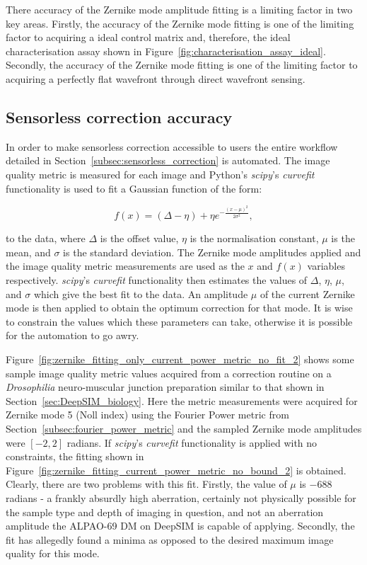 There accuracy of the Zernike mode amplitude fitting is a limiting factor in two key areas. Firstly, the accuracy of the Zernike mode fitting is one of the limiting factor to acquiring a ideal control matrix and, therefore, the ideal characterisation assay shown in Figure~\ref{fig:characterisation_assay_ideal}. Secondly, the accuracy of the Zernike mode fitting is one of the limiting factor to acquiring a perfectly flat wavefront through direct wavefront sensing.

\subsection{Sensorless correction accuracy}
\label{subsec:sensorless_accuracy}

In order to make sensorless correction accessible to users the entire 
workflow detailed in Section~\ref{subsec:sensorless_correction} is 
automated. The image quality metric is measured for each image and Python's 
\textit{scipy}'s \textit{curve\textunderscore fit} 
functionality\cite{virtanen2020scipy} is used to fit a Gaussian function of 
the form:

\begin{equation}\label{eq:gaussian}
	f(x) = (\Delta - \eta) + \eta e^{-\frac{\left(x-\mu\right)^{2}}{2\sigma^{2}}},
\end{equation}

to the data, where $\Delta$ is the offset value, $\eta$ is the 
normalisation constant, $\mu$ is the mean, and $\sigma$ is the standard 
deviation. The Zernike mode amplitudes applied and the image quality metric 
measurements are used as the $x$ and $f(x)$ variables respectively. 
\textit{scipy}'s \textit{curve\textunderscore fit} functionality then 
estimates the values of $\Delta$, $\eta$, $\mu$, and $\sigma$ which give 
the best fit to the data. An amplitude $\mu$ of the current Zernike mode is 
then applied to obtain the optimum correction for that mode. It is wise to 
constrain the values which these parameters can take, otherwise it is 
possible for the automation to go awry.

Figure~\ref{fig:zernike_fitting_only_current_power_metric_no_fit_2} shows 
some sample image quality metric values acquired from a correction routine 
on a \textit{Drosophilia} neuro-muscular junction preparation similar to 
that shown in Section~\ref{sec:DeepSIM_biology}. Here the metric 
measurements were acquired for Zernike mode 5 (Noll index) using the 
Fourier Power metric from Section~\ref{subsec:fourier_power_metric} and the 
sampled Zernike mode amplitudes were $[-2,2]$ radians. If \textit{scipy}'s 
\textit{curve\textunderscore fit} functionality is applied with no 
constraints, the fitting shown in 
Figure~\ref{fig:zernike_fitting_current_power_metric_no_bound_2} is 
obtained. Clearly, there are two problems with this fit. Firstly, the value 
of $\mu$ is $-688$ radians - a frankly absurdly high aberration, certainly 
not physically possible for the sample type and depth of imaging in 
question, and not an aberration amplitude the ALPAO-69 DM on DeepSIM is 
capable of applying. Secondly, the fit has allegedly found a minima as 
opposed to the desired maximum image quality for this mode. 

